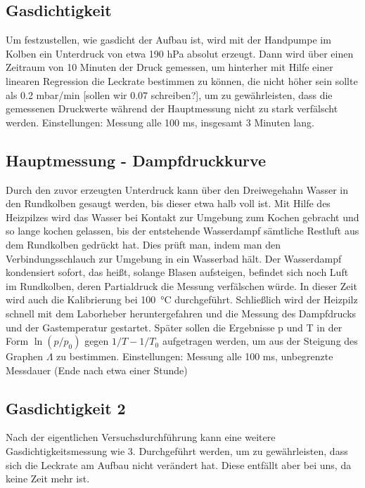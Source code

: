 \documentclass[]{article}
\begin{document}
\subsection{Gasdichtigkeit}
Um festzustellen, wie gasdicht der Aufbau ist, wird mit der Handpumpe im Kolben ein Unterdruck von etwa 190 hPa absolut erzeugt. Dann wird über einen Zeitraum von 10 Minuten der Druck gemessen, um hinterher mit Hilfe einer linearen Regression die Leckrate bestimmen zu können, die nicht höher sein sollte als 0.2 mbar/min {\color{red}[sollen wir 0.07 schreiben?]}, um zu gewährleisten, dass die gemessenen Druckwerte während der Hauptmessung nicht zu stark verfälscht werden. 
Einstellungen: Messung alle 100 ms, insgesamt 3 Minuten lang.


\subsection{Hauptmessung - Dampfdruckkurve}
Durch den zuvor erzeugten Unterdruck kann über den Dreiwegehahn Wasser in den Rundkolben gesaugt werden, bis dieser etwa halb voll ist. Mit Hilfe des Heizpilzes wird das Wasser bei Kontakt zur Umgebung zum Kochen gebracht und so lange kochen gelassen, bis der entstehende Wasserdampf sämtliche Restluft aus dem Rundkolben gedrückt hat. Dies prüft man, indem man den Verbindungsschlauch zur Umgebung in ein Wasserbad hält. Der Wasserdampf kondensiert sofort, das heißt, solange Blasen aufsteigen, befindet sich noch Luft im Rundkolben, deren Partialdruck die Messung verfälschen würde. In dieser Zeit wird auch die Kalibrierung bei \SI{100}{\celsius} durchgeführt. Schließlich wird der Heizpilz schnell mit dem Laborheber heruntergefahren und die Messung des Dampfdrucks und der Gastemperatur gestartet. Später sollen die Ergebnisse p und T in der Form $\ln(p/p_0)$ gegen $1/T-1/T_0$ aufgetragen werden, um aus der Steigung des Graphen $\Lambda$ zu bestimmen.
Einstellungen: Messung alle 100 ms, unbegrenzte Messdauer (Ende nach etwa einer Stunde)\\

\subsection{Gasdichtigkeit 2}

Nach der eigentlichen Versuchsdurchführung kann eine weitere Gasdichtigkeitsmessung wie 3. Durchgeführt werden, um zu gewährleisten, dass sich die Leckrate am Aufbau nicht verändert hat. Diese entfällt aber bei uns, da keine Zeit mehr ist.
\end{document}
